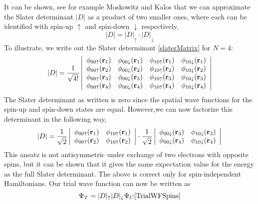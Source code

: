\documentclass[english, a4paper]{article}
\begin{document}
It can be shown, see for example Moskowitz and Kalos \cite{ref3} that we can approximate the Slater
determinant $|D|$ as a product of two smaller ones, where each can be identified with
spin-up $\uparrow$ and spin-down $\downarrow$ respectively,
\begin{equation}
 |D| = |D|_\uparrow \cdot |D|_\downarrow
\end{equation}
To illustrate, we write out the Slater determinant \eqref{slaterMatrix} for $N=4$:
\begin{equation}
    |D| = \frac{1}{\sqrt{4!}} \left|\begin{array}{cccc}
\phi_{00\uparrow}({\bf r}_1) &\phi_{00\downarrow}({\bf r}_1) 
&\phi_{10\uparrow}({\bf r}_1) &\phi_{10\downarrow}({\bf r}_1) \\
\phi_{00\uparrow}({\bf r}_2) &\phi_{00\downarrow}({\bf r}_2) 
&\phi_{10\uparrow}({\bf r}_2) &\phi_{10\downarrow}({\bf r}_2) \\
\phi_{00\uparrow}({\bf r}_3) &\phi_{00\downarrow}({\bf r}_3) 
&\phi_{10\uparrow}({\bf r}_3) &\phi_{10\downarrow}({\bf r}_3) \\
\phi_{00\uparrow}({\bf r}_4) &\phi_{00\downarrow}({\bf r}_4) 
&\phi_{10\uparrow}({\bf r}_4) &\phi_{10\downarrow}({\bf r}_4) \\
                      \end{array} \right|
\end{equation}
The Slater determinant as written is zero since the spatial wave functions for the
spin-up and spin-down states are equal. 
However,we can now factorize this determinant in the following way,
\begin{equation}
|D| = \frac{1}{\sqrt{2}}\left|\begin{array}{cc}
\phi_{00\uparrow}({\bf r}_1) &\phi_{10\uparrow}({\bf r}_1) \\
\phi_{00\uparrow}({\bf r}_2) &\phi_{10\uparrow}({\bf r}_2) \\
            \end{array} \right|
\cdot
\frac{1}{\sqrt{2}} \left| \begin{array}{cc}
\phi_{00\downarrow}({\bf r}_3) &\phi_{10\downarrow}({\bf r}_3) \\
\phi_{00\downarrow}({\bf r}_4) &\phi_{10\downarrow}({\bf r}_4) \\
       \end{array} \right|
       \label{SlaterDetFactorized}
\end{equation}
This ansatz is not antisymmetric under exchange of two electrons with opposite spins, but it can 
be shown that it gives the same expectation value for the energy as the full Slater determinant. 
The above is correct only for spin-independent Hamiltonians. Our trial wave function
can now be written as
\begin{equation}
 \Psi_T = |D|_\uparrow |D|_\downarrow \Psi_C
 \eqref{TrialWFSpins}
\end{equation}
\end{document}
